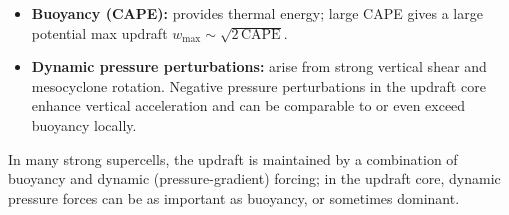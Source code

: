 \documentclass[12pt,a4paper]{article}
\begin{document}
\begin{itemize}
  \item \textbf{Buoyancy (CAPE):} provides thermal energy; large CAPE
        gives a large potential max updraft
        \(w_{\max} \sim \sqrt{2\,\text{CAPE}}\).
  \item \textbf{Dynamic pressure perturbations:} arise from strong
        vertical shear and mesocyclone rotation. Negative pressure
        perturbations in the updraft core enhance vertical acceleration
        and can be comparable to or even exceed buoyancy locally.
\end{itemize}

In many strong supercells, the updraft is maintained by
a combination of buoyancy and dynamic (pressure-gradient)
forcing; in the updraft core, dynamic pressure forces can
be as important as buoyancy, or sometimes dominant.
\end{document}
